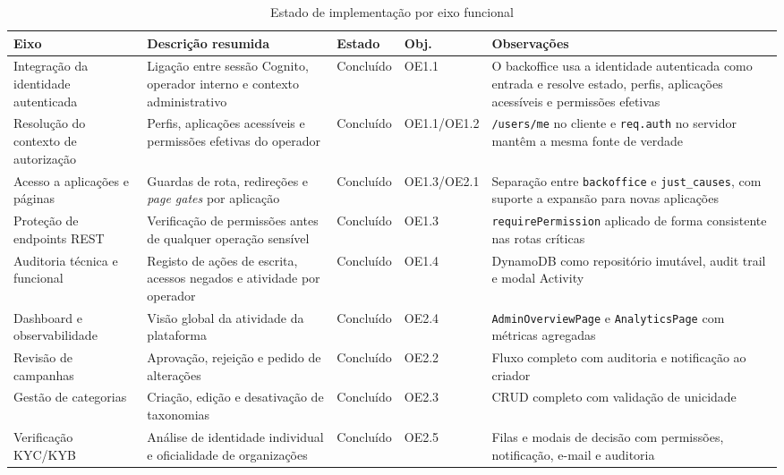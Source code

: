 \begin{table}[H]
\caption{Estado de implementação por eixo funcional}
\label{tab:avaliacao_rf}
\begin{center}
\begingroup
\scriptsize
\setlength{\tabcolsep}{4pt}
\begin{tabular}{|>{\raggedright\arraybackslash}p{2.3cm}|>{\raggedright\arraybackslash}p{3.2cm}|>{\raggedright\arraybackslash}p{1.2cm}|>{\raggedright\arraybackslash}p{1.8cm}|>{\raggedright\arraybackslash}p{3.7cm}|}
\hline
\textbf{Eixo} & \textbf{Descrição resumida} & \textbf{Estado} & \textbf{Obj.} & \textbf{Observações} \\ \hline
Integração da identidade autenticada & Ligação entre sessão Cognito, operador interno e contexto administrativo & Concluído & OE1.1 & O backoffice usa a identidade autenticada como entrada e resolve estado, perfis, aplicações acessíveis e permissões efetivas \\ \hline
Resolução do contexto de autorização & Perfis, aplicações acessíveis e permissões efetivas do operador & Concluído & OE1.1/OE1.2 & \texttt{/users/me} no cliente e \texttt{req.auth} no servidor mantêm a mesma fonte de verdade \\ \hline
Acesso a aplicações e páginas & Guardas de rota, redireções e \textit{page gates} por aplicação & Concluído & OE1.3/OE2.1 & Separação entre \texttt{backoffice} e \texttt{just\_causes}, com suporte a expansão para novas aplicações \\ \hline
Proteção de endpoints \gls{REST} & Verificação de permissões antes de qualquer operação sensível & Concluído & OE1.3 & \texttt{requirePermission} aplicado de forma consistente nas rotas críticas \\ \hline
Auditoria técnica e funcional & Registo de ações de escrita, acessos negados e atividade por operador & Concluído & OE1.4 & DynamoDB como repositório imutável, audit trail e modal Activity \\ \hline
Dashboard e observabilidade & Visão global da atividade da plataforma & Concluído & OE2.4 & \texttt{AdminOverviewPage} e \texttt{AnalyticsPage} com métricas agregadas \\ \hline
Revisão de campanhas & Aprovação, rejeição e pedido de alterações & Concluído & OE2.2 & Fluxo completo com auditoria e notificação ao criador \\ \hline
Gestão de categorias & Criação, edição e desativação de taxonomias & Concluído & OE2.3 & \gls{CRUD} completo com validação de unicidade \\ \hline
Verificação KYC/KYB & Análise de identidade individual e oficialidade de organizações & Concluído & OE2.5 & Filas e modais de decisão com permissões, notificação, e-mail e auditoria \\ \hline

\end{tabular}
\end{center}
\end{table}

